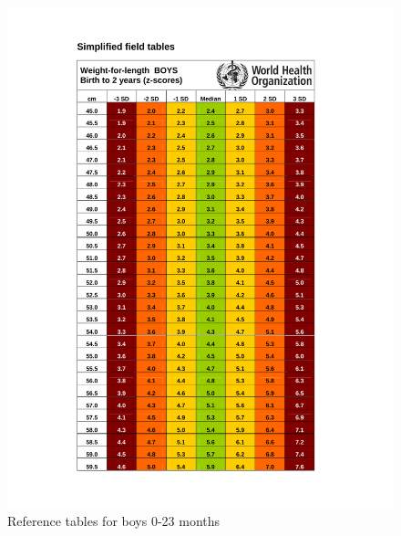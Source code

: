 \documentclass[12pt,]{book}
\theoremstyle{definition}
\theoremstyle{definition}
\theoremstyle{definition}
\theoremstyle{remark}
\begin{document}
\begin{figure}[H]

{\centering \includegraphics[width=1\linewidth]{pdf/boys_0_24} 

}

\caption{Reference tables for boys 0-23 months}\label{fig:anthro11}
\end{figure}\begin{figure}[H]


\end{figure}
\end{document}
